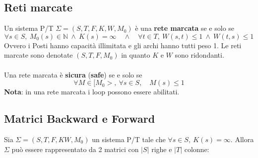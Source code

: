 \subsection{Reti marcate}
Un sistema P/T $\Sigma = (S, T, F, K, W, M_0)$ è una \textbf{rete marcata} se e solo se
\[
	\forall s \in S, \ M_0(s) \in \mathbb N
	\ \wedge \ K(s) = \infty \quad \wedge \quad
	\forall t \in T, \ W(s, t) \leq 1 \ \wedge \
	W(t, s) \leq 1
\]
Ovvero i Posti hanno capacità illimitata e gli archi hanno tutti peso 1. Le reti marcate sono denotate $(S, T, F, M_0)$ in quanto $K$ e $W$ sono ridondanti.
\\
\\
Una rete marcata è \textbf{sicura} (\textbf{safe}) se e solo se
\[
	\forall M \in [M_0>, \ \forall s \in S, \quad M(s) \leq 1
\]
\textbf{Nota}: in una rete marcata i loop possono essere abilitati.

\subsection{Matrici Backward e Forward}
Sia $\Sigma = (S, T, F, K W, M_0)$ un sistema P/T tale che $\forall s \in S, \ K(s) = \infty$. Allora $\Sigma$ può essere rappresentato da 2 matrici con $|S|$ righe e $|T|$ colonne:

